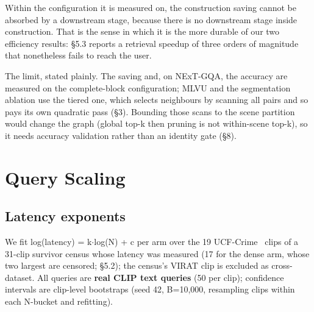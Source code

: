 \documentclass[sigconf,review,anonymous]{acmart}
\begin{document}
Within the configuration it is measured on, the construction saving cannot be absorbed by a
downstream stage, because there is no downstream stage inside construction. That is the
sense in which it is the more durable of our two efficiency results: §5.3 reports a
retrieval speedup of three orders of magnitude that nonetheless fails to reach the user.

The limit, stated plainly. The saving and, on NExT-GQA, the accuracy are measured on the
complete-block configuration; MLVU and the segmentation ablation use the tiered one, which
selects neighbours by scanning all pairs and so pays its own quadratic pass (§3). Bounding
those scans to the scene partition would change the graph (global top-k then pruning is not
within-scene top-k), so it needs accuracy validation rather than an identity gate (§8).

\section{Query Scaling}

\subsection{Latency exponents}

We fit log(latency) = k\ensuremath{\cdot}log(N) + c per arm over the 19 UCF-Crime~\cite{sultani2018ucfcrime} clips of a 31-clip survivor census whose latency was measured (17 for the dense arm, whose two largest are censored; §5.2); the census's VIRAT clip is excluded as cross-dataset. All queries are \textbf{real CLIP text
queries} (50 per clip); confidence intervals are clip-level bootstraps (seed 42, B=10,000,
resampling clips within each N-bucket and refitting).
\end{document}
